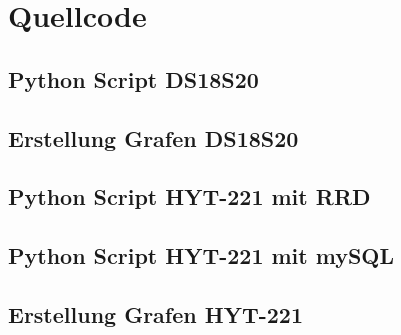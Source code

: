 \chapter{Quellcode}
\section{Python Script DS18S20}
\label{Python Script DS18S20}

\newpage


\section{Erstellung Grafen DS18S20}
\label{Erstellung Graphen DS18S20}

\newpage

\section{Python Script HYT-221 mit RRD}
\label{Python Script HYT-221 mit RDD}

\newpage

\section{Python Script HYT-221 mit mySQL}
\label{Python Script HYT-221 mit mySQL}

\newpage

\section{Erstellung Grafen HYT-221}
\label{Erstellung Graphen HYT-221}

\newpage

